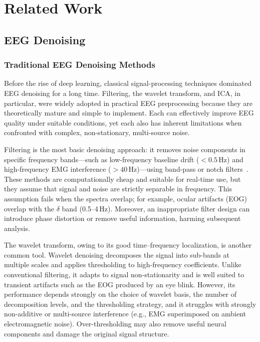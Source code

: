 \section{Related Work}
\label{sec:related}

\subsection{EEG Denoising}
\label{sec:related_denoise}

\subsubsection{Traditional EEG Denoising Methods}
Before the rise of deep learning, classical signal-processing techniques
dominated EEG denoising for a long time. Filtering, the wavelet transform, and
ICA, in particular, were widely adopted in practical EEG preprocessing because
they are theoretically mature and simple to implement. Each can effectively
improve EEG quality under suitable conditions, yet each also has inherent
limitations when confronted with complex, non-stationary, multi-source noise.

Filtering is the most basic denoising approach: it removes noise components in
specific frequency bands---such as low-frequency baseline drift ($<0.5$\,Hz) and
high-frequency EMG interference ($>40$\,Hz)---using band-pass or notch
filters~\cite{zhang2021eegdenoisenet}. These methods are computationally cheap
and suitable for real-time use, but they assume that signal and noise are
strictly separable in frequency. This assumption fails when the spectra overlap;
for example, ocular artifacts (EOG) overlap with the $\delta$ band
(0.5--4\,Hz). Moreover, an inappropriate filter design can introduce phase
distortion or remove useful information, harming subsequent analysis.

The wavelet transform, owing to its good time--frequency localization, is
another common tool. Wavelet denoising decomposes the signal into sub-bands at
multiple scales and applies thresholding to high-frequency coefficients. Unlike
conventional filtering, it adapts to signal non-stationarity and is well suited
to transient artifacts such as the EOG produced by an eye blink. However, its
performance depends strongly on the choice of wavelet basis, the number of
decomposition levels, and the thresholding strategy, and it struggles with
strongly non-additive or multi-source interference (e.g., EMG superimposed on
ambient electromagnetic noise). Over-thresholding may also remove useful neural
components and damage the original signal structure.

